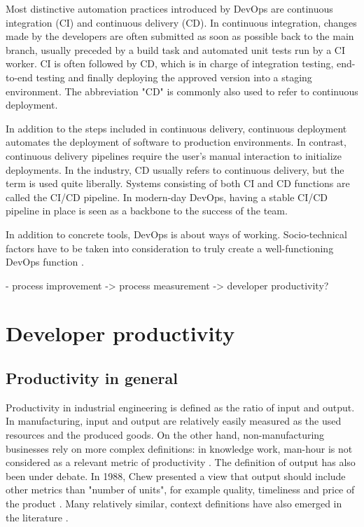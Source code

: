 Most distinctive automation practices introduced by DevOps are continuous integration (CI) and continuous delivery (CD). In continuous integration, changes made by the developers are often submitted as soon as possible back to the main branch, usually preceded by a build task and automated unit tests run by a CI worker. CI is often followed by CD, which is in charge of integration testing, end-to-end testing and finally deploying the approved version into a staging environment. The abbreviation "CD" is commonly also used to refer to continuous deployment. 

In addition to the steps included in continuous delivery, continuous deployment automates the deployment of software to production environments. In contrast, continuous delivery pipelines require the user's manual interaction to initialize deployments. In the industry, CD usually refers to continuous delivery, but the term is used quite liberally. Systems consisting of both CI and CD functions are called the CI/CD pipeline. In modern-day DevOps, having a stable CI/CD pipeline in place is seen as a backbone to the success of the team. 

In addition to concrete tools, DevOps is about ways of working. Socio-technical factors have to be taken into consideration to truly create a well-functioning DevOps function \cite{hemon-hildgen_agile_2020}. 


- process improvement -> process measurement -> developer productivity?

\section{Developer productivity}

\subsection{Productivity in general}
Productivity in industrial engineering is defined as the ratio of input and output\cite{syverson_what_2011}\cite{chew_no-nonsense_1988}. In manufacturing, input and output are relatively easily measured as the used resources and the produced goods. On the other hand, non-manufacturing businesses rely on more complex definitions: in knowledge work, man-hour is not considered as a relevant metric of productivity \cite{tangen_demystifying_2005}. The definition of output has also been under debate. In 1988, Chew presented a view that output should include other metrics than "number of units", for example quality, timeliness and price of the product \cite{chew_no-nonsense_1988}. Many relatively similar, context definitions have also emerged in the literature \cite{tangen_demystifying_2005}.


